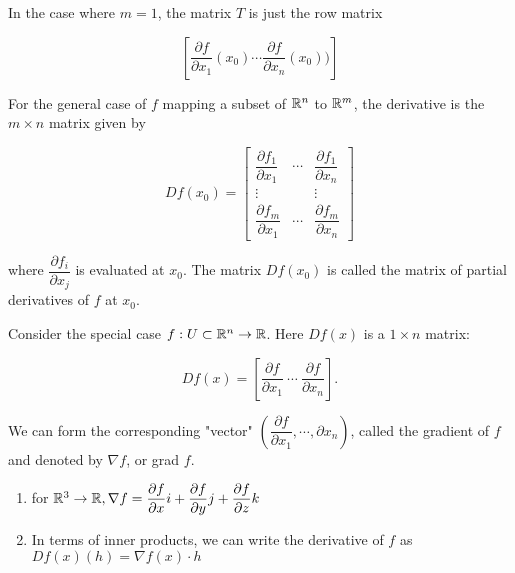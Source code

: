 \begin{rmk*}
	In the case where $m = 1$, the matrix $T$ is just the row matrix
	
	$$[\dfrac{\partial f}{\partial x_1}(x_0) \cdots \dfrac{\partial f}{\partial x_n}(x_0))]$$	
	
	For the general case of $f$ mapping a subset of $\mathbb{R}^n$ to $\mathbb{R}^m$, the derivative is the $m \times n$ matrix given by
	
	$$Df(x_0) = \left[ \begin{matrix}
 \dfrac{\partial f_1}{\partial x_1} & \cdots & \dfrac{\partial f_1}{\partial x_n}\\
 \vdots & & \vdots\\
 \dfrac{\partial f_m}{\partial x_1}& \cdots & \dfrac{\partial f_m}{\partial x_n}	
 \end{matrix}
\right]$$

	where $\dfrac{\partial f_i}{\partial x_j}$ is evaluated at $x_0$. The matrix $Df(x_0)$ is called the matrix of partial derivatives of $f$ at $x_0$.
\end{rmk*}

\begin{defn}
	Consider the special case $f: U \subset \mathbb{R}^n \rightarrow \mathbb{R}$. Here $Df(x)$ is a $1 \times n$ matrix:
	
	$$Df(x) = [\dfrac{\partial f}{\partial x_1}~\cdots ~ \dfrac{\partial f}{\partial x_n}].$$
	
	We can form the corresponding "vector" $(\dfrac{\partial f}{\partial x_1},\cdots,\partial x_n)$, called the gradient of $f$ and denoted by $\nabla f$, or grad $f$.	 
\end{defn}

\begin{rmk*}
	\begin{enumerate}[wide,label = $\bullet$]
			\item for $\mathbb{R}^3 \rightarrow \mathbb{R}, \nabla f = \dfrac{\partial f}{\partial x} i + \dfrac{\partial f}{\partial y}j + \dfrac{\partial f}{\partial z}k$
			\item In terms of inner products, we can write the derivative of $f$ as $Df(x)(h) = \nabla f(x) \cdot h$
	\end{enumerate}
	
\end{rmk*}

